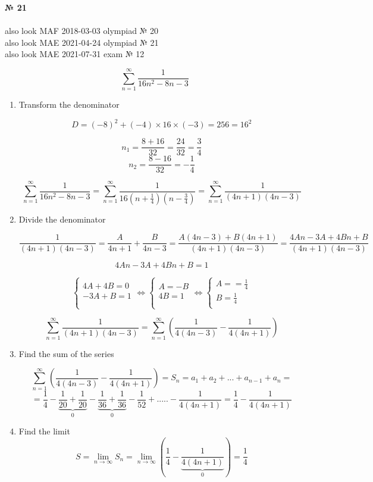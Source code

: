 \documentclass{article}
\begin{document}
\textbf{№ 21} 
\\
\\ also look MAF 2018-03-03 olympiad № 20
\\ also look MAE 2021-04-24 olympiad № 21
\\ also look MAE 2021-07-31 exam № 12

$$ \sum_{n=1}^{\infty} \frac{1}{16n^2-8n-3} $$

\begin{enumerate}

\item Transform the denominator

$$ D = (-8)^2 + (-4)\times16\times(-3)=256=16^2 $$

$$ n_1 = \frac{8+16}{32}=\frac{24}{32} = \frac{3}{4} $$
$$ n_2 = \frac{8-16}{32}=-\frac{1}{4} $$

$$\sum_{n=1}^{\infty} \frac{1}{16n^2-8n-3} 
= \sum_{n=1}^{\infty} \frac{1}{16(n+\frac{1}{4})(n-\frac{3}{4})} 
= \sum_{n=1}^{\infty} \frac{1}{(4n+1)(4n-3)}$$

\item Divide the denominator

$$\frac{1}{(4n+1)(4n-3)} 
= \frac{A}{4n+1} + \frac{B}{4n-3} 
= \frac{A(4n-3)+B(4n+1)}{(4n+1)(4n-3)} 
= \frac{4An-3A+4Bn+B}{(4n+1)(4n-3)}$$

$$4An-3A+4Bn+B = 1$$

$$
\left\{
  \begin{array}{ccc}
    4A + 4B = 0 \\
    -3A+B = 1 \\
  \end{array}\Leftrightarrow
\left\{
  \begin{array}{ccc}
    A = -B \\
    4B = 1 \\
  \end{array}\Leftrightarrow
\left\{
  \begin{array}{ccc}
    A = =\frac{1}{4} \\
    B = \frac{1}{4} \\
  \end{array}
$$

$$ \sum_{n=1}^{\infty} \frac{1}{(4n+1)(4n-3)} = 
\sum_{n=1}^{\infty} \left(\frac{1}{4(4n-3)} - \frac{1}{4(4n+1)}\right) $$

\item Find the sum of the series

$$ \sum_{n=1}^{\infty} \left(\frac{1}{4(4n-3)} - \frac{1}{4(4n+1)}\right) 
= S_n = a_1+a_2+...+a_{n-1}+a_n = $$
$$ = \frac{1}{4} - \underbrace{\frac{1}{20} + \frac{1}{20}}_{0} - \underbrace{\frac{1}{36} + \frac{1}{36}}_{0} - \frac{1}{52} + ..... - \frac{1}{4(4n+1)} = \frac{1}{4} - \frac{1}{4(4n+1)}$$

\item Find the limit
$$S = \lim_{n\to\infty} S_n 
= \lim_{n\to\infty} \left(\frac{1}{4} - \underbrace{\frac{1}{4(4n+1)}}_{0}\right) 
= \frac{1}{4} $$


\end{enumerate}
\end{document}
